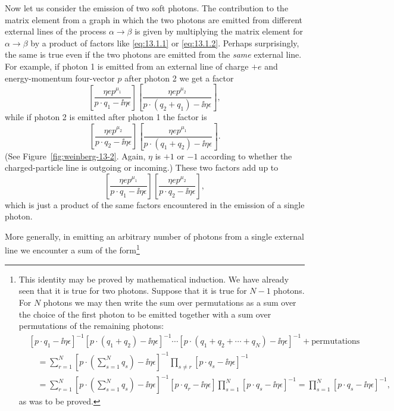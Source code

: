 Now let us consider the emission of two soft photons. The contribution
to the matrix element from a graph in which the two photons are emitted
from different external lines of the process $\alpha\to\beta$ is given by multiplying
the matrix element for $\alpha\to\beta$ by a product of factors like
\eqref{eq:13.1.1} or \eqref{eq:13.1.2}. Perhaps surprisingly,
the same is true even if the two photons are
emitted from the \emph{same} external line. For example, if photon 1 is emitted
from an external line of charge $+e$ and energy-momentum four-vector $p$
after photon 2 we get a factor
\[
  \left[\frac{\eta e p^{\mu_1}}{p\cdot q_1-\ii\eta\epsilon}\right]
  \left[\frac{\eta e p^{\mu_2}}{p\cdot(q_2+q_1)-\ii\eta\epsilon}\right],
\]
while if photon 2 is emitted after photon 1 the factor is
\[
  \left[\frac{\eta e p^{\mu_2}}{p\cdot q_2-\ii\eta\epsilon}\right]
  \left[\frac{\eta e p^{\mu_1}}{p\cdot(q_1+q_2)-\ii\eta\epsilon}\right].
\]
(See Figure~\ref{fig:weinberg-13-2}. Again, $\eta$ is $+1$ or $-1$ according to whether the
charged-particle line is outgoing or incoming.) These two factors add up to
\[
  \left[\frac{\eta e p^{\mu_1}}{p\cdot q_1-\ii\eta\epsilon}\right]
  \left[\frac{\eta e p^{\mu_2}}{p\cdot q_2-\ii\eta\epsilon}\right],
\]
which is just a product of the same factors encountered in the emission
of a single photon.

More generally, in emitting an arbitrary number of photons from a
single external line we encounter a sum of the form\footnote{This identity
may be proved by mathematical induction. We have already seen that it is true for
two photons. Suppose that it is true for $N-1$ photons. For $N$ photons we may then write the
sum over permutations as a sum over the choice of the first photon to be emitted together with
a sum over permutations of the remaining photons:
\begin{align*}
 &[p\cdot q_1-\ii\eta\epsilon]^{-1}[p\cdot(q_1+q_2)-\ii\eta\epsilon]^{-1}\cdots
 [p\cdot(q_1+q_2+\cdots+q_N)-\ii\eta\epsilon]^{-1}+\text{permutations}
 \\
 &\quad=\sum_{r=1}^{N}\left[p\cdot\left(\sum_{s=1}^{N}q_s\right)-\ii\eta\epsilon\right]^{-1}
 \prod_{s\ne r}[p\cdot q_s-\ii\eta\epsilon]^{-1}
 \\
 &\quad=\sum_{r=1}^{N}\left[p\cdot\left(\sum_{s=1}^{N}q_s\right)-\ii\eta\epsilon\right]^{-1}
 [p\cdot q_r-\ii\eta\epsilon]
 \prod_{s=1}^{N}[p\cdot q_s-\ii\eta\epsilon]^{-1}
 =\prod_{s=1}^{N}[p\cdot q_s-\ii\eta\epsilon]^{-1},
\end{align*}
as was to be proved.}

